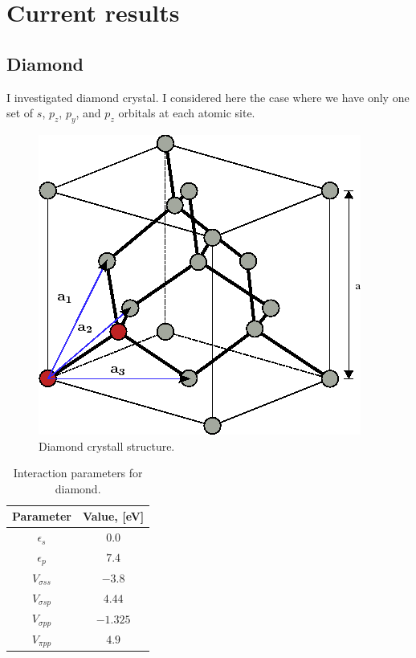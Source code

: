 \chapter{Current results}\label{r:results}
\section{Diamond}
I investigated diamond crystal. I considered here the case where we have only one set of $s$, $p_z$, $p_y$, and $p_z$ orbitals at each
atomic site.
\begin{figure}[h] 
 \begin{center}
  \includegraphics[width=0.3\linewidth]{img/diamond_crystall}
  \caption{Diamond crystall structure.}
 \end{center}
\end{figure}

\begin{table}[h]
 \begin{center}
  \begin{tabular}{|c|c|}
  \hline
    Parameter&Value, [eV]\\ \hline
    $\epsilon_s$ & $0.0$ \\ \hline
    $\epsilon_p$ & $7.4$ \\ \hline
    $V_{\sigma ss}$ & $-3.8$  \\ \hline
    $V_{\sigma sp}$ & $4.44$\\ \hline
    $V_{\sigma pp}$ & $-1.325$ \\ \hline
    $V_{\pi pp}$ &  $4.9$\\ \hline
  \end{tabular}
 \end{center}
  \caption{Interaction parameters for diamond.}
\end{table}

